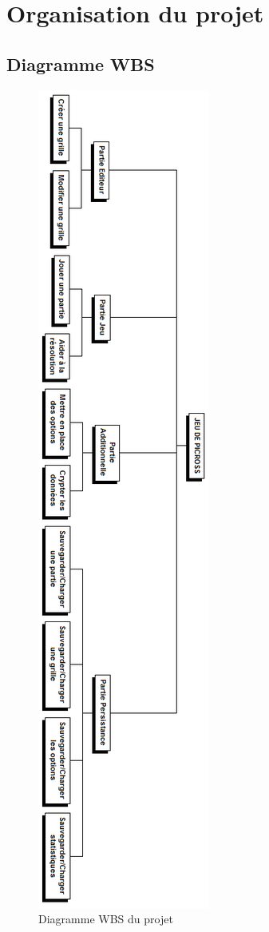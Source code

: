\documentclass[a4paper, 12pt, twoside]{article}
\begin{document}
\section{Organisation du projet}


\newpage\thispagestyle{empty}

\subsection{Diagramme WBS}

\begin{figure}[!h]
  \center
  \includegraphics[scale=0.61]{WBS.png}
  \caption{Diagramme WBS du projet}
  \label{diagWBS}
\end{figure}
\end{document}
